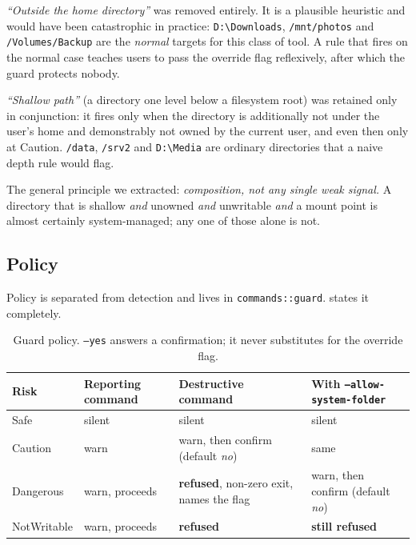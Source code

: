 \documentclass[11pt,a4paper]{article}
\newcommand{\code}[1]{\texttt{\small #1}}
\begin{document}
\emph{\enquote{Outside the home directory}} was removed entirely. It is a plausible
heuristic and would have been catastrophic in practice:
\code{D:\textbackslash Downloads}, \code{/mnt/photos} and \code{/Volumes/Backup} are the
\emph{normal} targets for this class of tool. A rule that fires on the normal case
teaches users to pass the override flag reflexively, after which the guard protects
nobody.

\emph{\enquote{Shallow path}} (a directory one level below a filesystem root) was
retained only in conjunction: it fires only when the directory is additionally not
under the user's home and demonstrably not owned by the current user, and even then
only at \textsf{Caution}. \code{/data}, \code{/srv2} and \code{D:\textbackslash Media} are ordinary
directories that a naive depth rule would flag.

The general principle we extracted: \emph{composition, not any single weak signal.} A
directory that is shallow \emph{and} unowned \emph{and} unwritable \emph{and} a mount
point is almost certainly system-managed; any one of those alone is not.

\subsection{Policy}
\label{sec:detect:policy}

Policy is separated from detection and lives in \code{commands::guard}.
 states it completely.

\begin{table}[t]
\centering
\small
\caption{Guard policy. \code{--yes} answers a confirmation; it never substitutes for
the override flag.}
\label{tab:policy}
\begin{tabularx}{\textwidth}{@{}l X X X@{}}
\toprule
\textbf{Risk} & \textbf{Reporting command} & \textbf{Destructive command} &
\textbf{With \code{--allow-system-folder}} \\
\midrule
\textsf{Safe} & silent & silent & silent \\
\textsf{Caution} & warn & warn, then confirm (default \emph{no}) & same \\
\textsf{Dangerous} & warn, proceeds & \textbf{refused}, non-zero exit, names the flag &
  warn, then confirm (default \emph{no}) \\
\textsf{NotWritable} & warn, proceeds & \textbf{refused} & \textbf{still refused} \\
\bottomrule
\end{tabularx}
\end{table}
\end{document}
